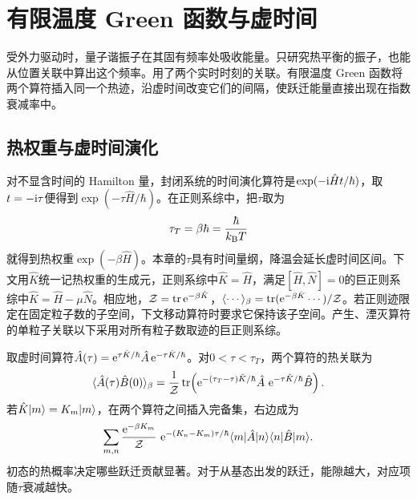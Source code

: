 \chapter{有限温度 Green 函数与虚时间}\label{chap:thermal-green}

受外力驱动时，量子谐振子在其固有频率处吸收能量。只研究热平衡的振子，也能从位置关联中算出这个频率。用了两个实时时刻的关联。有限温度 Green 函数将两个算符插入同一个热迹，沿虚时间改变它们的间隔，使跃迁能量直接出现在指数衰减率中。

\section{热权重与虚时间演化}
对不显含时间的 Hamilton 量，封闭系统的时间演化算符是$\exp(-\mathrm{i}\hat Ht/\hbar)$，取$t = -\mathrm{i}\tau$便得到$\exp(-\tau\hat H/\hbar)$。在正则系综中，把$\tau$取为
\begin{equation}
	\label{eq:sm-thermal-time-period}
	\tau_T = \beta\hbar = \frac{\hbar}{k_{\mathrm{B}} T}
\end{equation}
就得到热权重$\exp(-\beta\hat H)$。本章的$\tau$具有时间量纲，降温会延长虚时间区间。下文用$\hat K$统一记热权重的生成元，正则系综中$\hat K = \hat H$，满足$[\hat H,\hat N] = 0$的巨正则系综中$\hat K = \hat H - \mu\hat N$。相应地，$\mathcal Z = \operatorname{tr}\mathop{}\!\mathrm{e}^{-\beta\hat K}$，$\langle\cdots\rangle_\beta = \operatorname{tr}(\mathop{}\!\mathrm{e}^{-\beta\hat K}\cdots)/\mathcal Z$。若正则迹限定在固定粒子数的子空间，下文移动算符时要求它保持该子空间。产生、湮灭算符的单粒子关联以下采用对所有粒子数取迹的巨正则系综。

取虚时间算符$\hat A(\tau) = \mathop{}\!\mathrm{e}^{\tau\hat K/\hbar}\hat A\mathop{}\!\mathrm{e}^{-\tau\hat K/\hbar}$。对$0 < \tau < \tau_T$，两个算符的热关联为
\begin{equation}
	\langle\hat A(\tau)\hat B(0)\rangle_\beta
	= \frac1{\mathcal Z}\operatorname{tr}\!\left(
	\mathop{}\!\mathrm{e}^{-(\tau_T-\tau)\hat K/\hbar}\hat A\,
	\mathop{}\!\mathrm{e}^{-\tau\hat K/\hbar}\hat B\right).
	\label{eq:sm-thermal-trace}
\end{equation}
若$\hat K\lvert m\rangle = K_m\lvert m\rangle$，在两个算符之间插入完备集，右边成为
\[
	\sum_{m,n}\frac{\mathop{}\!\mathrm{e}^{-\beta K_m}}{\mathcal Z}\,
	\mathop{}\!\mathrm{e}^{-(K_n-K_m)\tau/\hbar}\langle m\vert\hat A\vert n\rangle\langle n\vert\hat B\vert m\rangle.
\]
初态的热概率决定哪些跃迁贡献显著。对于从基态出发的跃迁，能隙越大，对应项随$\tau$衰减越快。

